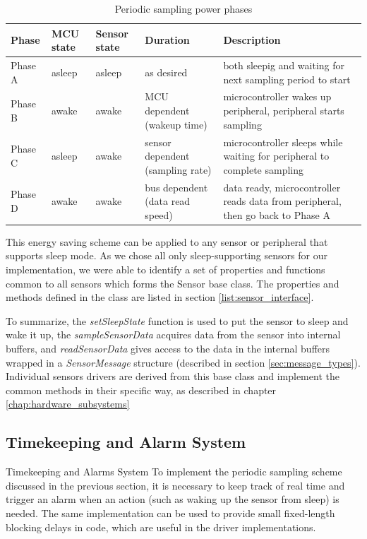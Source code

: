 \begin{table}
\centering
\begin{tabular}{|l|m{1.5cm}|m{1.5cm}|m{2.5cm}|m{4.5cm}|}
\hline
	\textbf{Phase}  &
	\textbf{MCU state}  &
	\bfseries Sensor state  &
	\textbf{Duration}  &
	\textbf{Description}  \\ 
\hline
	Phase A &
	asleep  &
	asleep  &
	as desired  &
	both sleepig and waiting for next sampling period to start  \\ 
\hline
	Phase B &
	awake  &
	awake  &
	MCU dependent (wakeup time)  &
	microcontroller wakes up peripheral, peripheral starts sampling  \\ 
\hline
	Phase C &
	asleep  &
	awake  &
	sensor dependent (sampling rate)  &
	microcontroller sleeps while waiting for peripheral to complete sampling  \\ 
\hline
	Phase D &
	awake  &
	awake  &
	bus dependent (data read speed)  &
	data ready, microcontroller reads data from peripheral, then go back to Phase A   \\ 
\hline 
\end{tabular}
\caption{Periodic sampling power phases}
\label{tab:power_phases} 
\end{table}

This energy saving scheme can be applied to any sensor or peripheral that supports sleep mode. As we chose all only sleep-supporting sensors for our implementation, we were able to identify a set of properties and functions common to all sensors which forms the Sensor base class. The properties and methods defined in the class are listed in section \ref{list:sensor_interface}. 

To summarize, the \textit{setSleepState} function is used to put the sensor to sleep and wake it up, the \textit{sampleSensorData} acquires data from the sensor into internal buffers, and \textit{readSensorData} gives access to the data in the internal buffers wrapped in a \textit{SensorMessage} structure (described in section \ref{sec:message_types}). Individual sensors drivers are derived from this base class and implement the common methods in their specific way, as described in chapter \ref{chap:hardware_subsystems} 


\subsection{Timekeeping and Alarm System}
\label{sec:timekeeping}
Timekeeping and Alarms System
To implement the periodic sampling scheme discussed in the previous section, it is necessary to keep track of real time and trigger an alarm when an action (such as waking up the sensor from sleep) is needed. The same implementation can be used to provide small fixed-length blocking delays in code, which are useful in the driver implementations.

